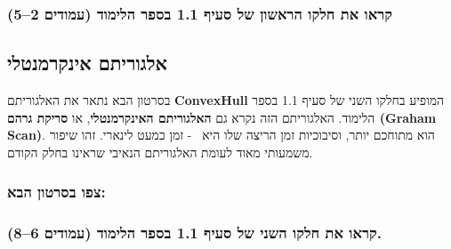 \documentclass[
]{book}
\begin{document}
\hypertarget{ux5e7ux5e8ux5d0ux5d5-ux5d0ux5ea-ux5d7ux5dcux5e7ux5d5-ux5d4ux5e8ux5d0ux5e9ux5d5ux5df-ux5e9ux5dc-ux5e1ux5e2ux5d9ux5e3-1.1-ux5d1ux5e1ux5e4ux5e8-ux5d4ux5dcux5d9ux5deux5d5ux5d3-ux5e2ux5deux5d5ux5d3ux5d9ux5dd-25}{%
\subsubsection*{קראו את חלקו הראשון של סעיף 1.1 בספר הלימוד (עמודים 2--5)}\label{ux5e7ux5e8ux5d0ux5d5-ux5d0ux5ea-ux5d7ux5dcux5e7ux5d5-ux5d4ux5e8ux5d0ux5e9ux5d5ux5df-ux5e9ux5dc-ux5e1ux5e2ux5d9ux5e3-1.1-ux5d1ux5e1ux5e4ux5e8-ux5d4ux5dcux5d9ux5deux5d5ux5d3-ux5e2ux5deux5d5ux5d3ux5d9ux5dd-25}}

\hypertarget{incremental-alg}{%
\subsection{אלגוריתם אינקרמנטלי}\label{incremental-alg}}

בסרטון הבא נתאר את האלגוריתם \textbf{ConvexHull} המופיע בחלקו השני של סעיף 1.1 בספר הלימוד. האלגוריתם הזה נקרא גם \textbf{האלגוריתם האינקרמנטלי}, או \textbf{סריקת גרהם (Graham Scan)}. הוא מתוחכם יותר, וסיבוכיות זמן הריצה שלו היא ~- זמן כמעט לינארי. זהו שיפור משמעותי מאוד לעומת האלגוריתם הנאיבי שראינו בחלק הקודם.~

\hypertarget{ux5e6ux5e4ux5d5-ux5d1ux5e1ux5e8ux5d8ux5d5ux5df-ux5d4ux5d1ux5d0}{%
\subsubsection*{צפו בסרטון הבא:}\label{ux5e6ux5e4ux5d5-ux5d1ux5e1ux5e8ux5d8ux5d5ux5df-ux5d4ux5d1ux5d0}}

\hypertarget{ux5e7ux5e8ux5d0ux5d5-ux5d0ux5ea-ux5d7ux5dcux5e7ux5d5-ux5d4ux5e9ux5e0ux5d9-ux5e9ux5dc-ux5e1ux5e2ux5d9ux5e3-1.1-ux5d1ux5e1ux5e4ux5e8-ux5d4ux5dcux5d9ux5deux5d5ux5d3-ux5e2ux5deux5d5ux5d3ux5d9ux5dd-68.}{%
\subsubsection*{קראו את חלקו השני של סעיף 1.1 בספר הלימוד (עמודים 6--8).}\label{ux5e7ux5e8ux5d0ux5d5-ux5d0ux5ea-ux5d7ux5dcux5e7ux5d5-ux5d4ux5e9ux5e0ux5d9-ux5e9ux5dc-ux5e1ux5e2ux5d9ux5e3-1.1-ux5d1ux5e1ux5e4ux5e8-ux5d4ux5dcux5d9ux5deux5d5ux5d3-ux5e2ux5deux5d5ux5d3ux5d9ux5dd-68.}}
\end{document}
